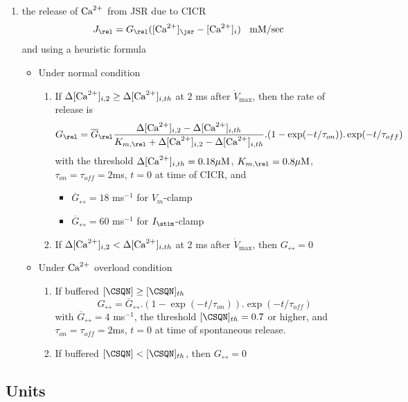 \begin{enumerate}
\item the release of ${\text{Ca}^{2+}}$ from JSR due to CICR
  \begin{equation}
    \label{eq:1292}
    J_\rel = G_\rel ([\Ca]_\jsr-[\Ca]_i)  \;\;\text{ mM/sec} 
  \end{equation}
and using a heuristic formula
\begin{itemize}
\item Under normal condition
  \begin{enumerate}
  \item If $\Delta [{\text{Ca}^{2+}}]_{i,2} \ge \Delta [{\text{Ca}^{2+}}]_{i,th}$ at 2 ms after
    $\dot{V}_\max$, then the rate of release is
    \begin{equation}
      \label{eq:1293}
      G_\rel = \overline{G}_\rel \frac{\Delta [\Ca]_{i,2} - \Delta [\Ca]_{i,th}}{K_{m,\rel}+\Delta [\Ca]_{i,2} - \Delta [\Ca]_{i,th}}.(1-\exp(-t/\tau_{on})).\exp(-t/\tau_{off})
    \end{equation}
    with the threshold $ \Delta [{\text{Ca}^{2+}}]_{i,th}=0.18{\mu\text{M}}$,
    $K_{m,\rel}=0.8\muM$, $\tau_{on}=\tau_{off}=2$ms, $t=0$ at time of
    CICR, and 
    \begin{itemize}
    \item $\overline{G}_\rel = 18$ ms$^{-1}$ for $V_m$-clamp
    \item $\overline{G}_\rel = 60$ ms$^{-1}$ for $I_\stim$-clamp 
    \end{itemize}
  \item If $\Delta [{\text{Ca}^{2+}}]_{i,2} < \Delta [{\text{Ca}^{2+}}]_{i,th}$ at 2 ms after
    $\dot{V}_\max$, then $G_\rel=0$
  \end{enumerate}
\item Under ${\text{Ca}^{2+}}$ overload condition
  \begin{enumerate}
  \item If buffered $[\CSQN] \ge [\CSQN]_{th}$
    \begin{equation}
      \label{eq:1294}
      G_\rel = \overline{G}_\rel .(1-\exp(-t/\tau_{on})).\exp(-t/\tau_{off})
    \end{equation}
    with $\overline{G}_\rel = 4$ ms$^{-1}$, the threshold $[\CSQN]_{th}=0.7$ or
    higher, and  $\tau_{on}=\tau_{off}=2$ms, $t=0$ at time of
    spontaneous release.
  \item  If buffered $[\CSQN] < [\CSQN]_{th}$, then $G_\rel = 0$
  \end{enumerate}
\end{itemize}
\end{enumerate}

\subsection{Units}
\label{sec:units-2}

